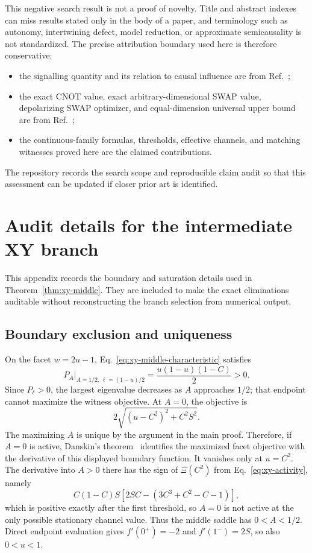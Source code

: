 \documentclass[11pt,a4paper]{article}
\theoremstyle{remark}
\begin{document}
This negative search result is not a proof of novelty.  Title and abstract
indexes can miss results stated only in the body of a paper, and terminology
such as autonomy, intertwining defect, model reduction, or approximate
semicausality is not standardized.  The precise attribution boundary used
here is therefore conservative:
\begin{itemize}
 \item the signalling quantity and its relation to causal influence are from
 Ref.~\cite{barsse2024};
 \item the exact CNOT value, exact arbitrary-dimensional SWAP value,
 depolarizing SWAP optimizer, and equal-dimension universal upper bound are
 from Ref.~\cite{barsse2025};
 \item the continuous-family formulas, thresholds, effective channels, and
 matching witnesses proved here are the claimed contributions.
\end{itemize}
The repository records the search scope and reproducible claim audit so that
this assessment can be updated if closer prior art is identified.

\section{Audit details for the intermediate XY branch}
\label{app:xy-audit}

This appendix records the boundary and saturation details used in
Theorem~\ref{thm:xy-middle}.  They are included to make the exact eliminations
auditable without reconstructing the branch selection from numerical output.

\subsection{Boundary exclusion and uniqueness}

On the facet $w=2u-1$, Eq.~\eqref{eq:xy-middle-characteristic} satisfies
\[
 P_A\big|_{A=1/2,\,\ell=(1-u)/2}
 =\frac{u(1-u)(1-C)}2>0.
\]
Since $P_\ell>0$, the largest eigenvalue decreases as $A$ approaches
$1/2$; that endpoint cannot maximize the witness objective.  At $A=0$, the
objective is
\[
 2\sqrt{(u-C^2)^2+C^2S^2}.
\]
The maximizing $A$ is unique by the argument in the main proof.  Therefore,
if $A=0$ is active, Danskin's theorem~\cite{danskin1967} identifies the
maximized facet objective with the derivative of this displayed boundary
function.  It vanishes only at $u=C^2$.  The derivative into $A>0$ there has
the sign of $\Xi(C^2)$ from Eq.~\eqref{eq:xy-activity}, namely
\[
 C(1-C)S[2SC-(3C^3+C^2-C-1)],
\]
which is positive exactly after the first threshold, so $A=0$ is not active
at the only possible stationary channel value.  Thus the middle saddle has
$0<A<1/2$.  Direct endpoint evaluation gives
$f'(0^+)=-2$ and $f'(1^-)=2S$, so also $0<u<1$.
\end{document}
